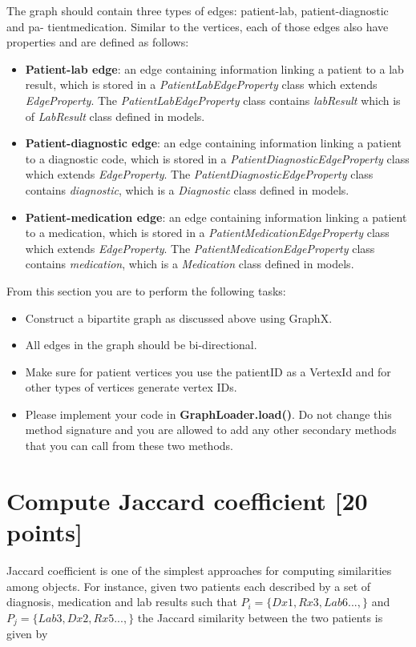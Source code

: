 \documentclass[12pt]{article}
\begin{document}
The graph should contain three types of edges: patient-lab, patient-diagnostic and pa- tientmedication. Similar to the vertices, each of those edges also have properties and are defined as follows:

\begin{itemize}
\item \textbf{Patient-lab edge}: an edge containing information linking a patient to a lab result, which is stored in a \textit{PatientLabEdgeProperty} class which extends  \textit{EdgeProperty}. The \textit{PatientLabEdgeProperty} class contains  \textit{labResult} which is of \textit{LabResult} class defined in models.

\item \textbf{Patient-diagnostic edge}: an edge containing information linking a patient to a diagnostic code, which is stored in a \textit{PatientDiagnosticEdgeProperty} class which extends \textit{EdgeProperty}. The \textit{PatientDiagnosticEdgeProperty} class contains \textit{diagnostic}, which is a \textit{Diagnostic} class defined in models.

\item \textbf{Patient-medication edge}: an edge containing information linking a patient to a medication, which is stored in a \textit{PatientMedicationEdgeProperty} class which extends \textit{EdgeProperty}. The \textit{PatientMedicationEdgeProperty} class contains \textit{medication}, which is a \textit{Medication} class defined in models.
\end{itemize}


\noindent From this section you are to perform the following tasks:
\begin{itemize}
\item Construct a bipartite graph as discussed above using GraphX.
\item All edges in the graph should be bi-directional.
\item Make sure for patient vertices you use the patientID as a VertexId and for other types of vertices generate vertex IDs.
\item Please implement your code in \textbf{GraphLoader.load()}. Do not change this method signature and you are allowed to add any other secondary methods that you can call from these two methods.
\end{itemize}

\section{Compute Jaccard coefficient [20 points]}
Jaccard coefficient is one of the simplest approaches for computing similarities among objects. For instance, given two patients each described by a set of diagnosis, medication and lab results such that $ P_i = \{Dx1, Rx3, Lab6 ...,\} $ and $ P_j = \{Lab3, Dx2, Rx5 ...,\} $ the Jaccard similarity between the two patients is given by \\
\end{document}
